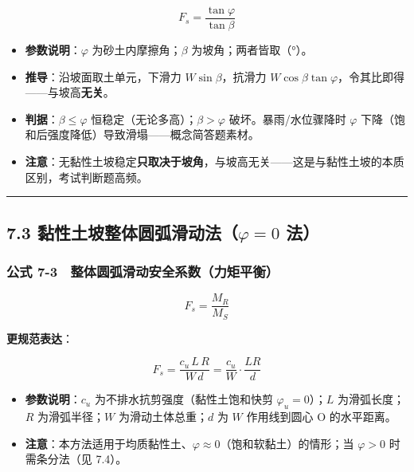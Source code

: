 \documentclass[
]{article}
\providecommand{\tightlist}{%
  \setlength{\itemsep}{0pt}\setlength{\parskip}{0pt}}
\begin{document}
\[\boxed{F_s=\frac{\tan\varphi}{\tan\beta}}\]

\begin{itemize}
\tightlist
\item
  \textbf{参数说明}：\(\varphi\) 为砂土内摩擦角；\(\beta\)
  为坡角；两者皆取（°）。
\item
  \textbf{推导}：沿坡面取土单元，下滑力 \(W\sin\beta\)，抗滑力
  \(W\cos\beta\tan\varphi\)，令其比即得------与坡高\textbf{无关}。
\item
  \textbf{判据}：\(\beta\le\varphi\)
  恒稳定（无论多高）；\(\beta>\varphi\) 破坏。暴雨/水位骤降时
  \(\varphi\) 下降（饱和后强度降低）导致滑塌------概念简答题素材。
\item
  \textbf{注意}：无黏性土坡稳定\textbf{只取决于坡角}，与坡高无关------这是与黏性土坡的本质区别，考试判断题高频。
\end{itemize}

\begin{center}\rule{0.5\linewidth}{0.5pt}\end{center}

\subsection{\texorpdfstring{7.3 黏性土坡整体圆弧滑动法（\(\varphi=0\)
法）}{7.3 黏性土坡整体圆弧滑动法（\textbackslash varphi=0 法）}}\label{ux9ecfux6027ux571fux5761ux6574ux4f53ux5706ux5f27ux6ed1ux52a8ux6cd5varphi0-ux6cd5}

\subsubsection{公式
7-3　整体圆弧滑动安全系数（力矩平衡）}\label{ux516cux5f0f-7-3-ux6574ux4f53ux5706ux5f27ux6ed1ux52a8ux5b89ux5168ux7cfbux6570ux529bux77e9ux5e73ux8861}

\[F_s=\frac{M_R}{M_S}\]

\textbf{更规范表达}：

\[F_s=\frac{c_u\,L\,R}{W\,d}=\frac{c_u}{W}\cdot\frac{L R}{d}\]

\begin{itemize}
\tightlist
\item
  \textbf{参数说明}：\(c_u\) 为不排水抗剪强度（黏性土饱和快剪
  \(\varphi_u=0\)）；\(L\) 为滑弧长度；\(R\) 为滑弧半径；\(W\)
  为滑动土体总重；\(d\) 为 \(W\) 作用线到圆心 O 的水平距离。
\item
  \textbf{注意}：本方法适用于均质黏性土、\(\varphi\approx0\)（饱和软黏土）的情形；当
  \(\varphi>0\) 时需条分法（见 7.4）。
\end{itemize}
\end{document}
